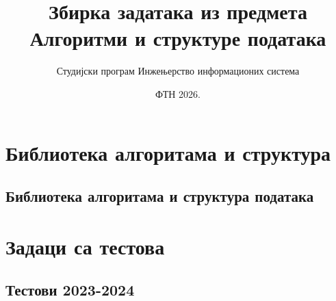 \documentclass[10pt]{book}
\title{\textbf{Збирка задатака из предмета}\\Алгоритми и структуре података}
\author{Студијски програм Инжењерство информационих система}
\date{ФТН 2026.}
\begin{document}
\maketitle

\tableofcontents

\lstlistoflistings

\newpage

\part{Библиотека алгоритама и структура}
\label{part.BibliotekaKomponenti}

\chapter{Библиотека алгоритама и структура података}




\part{Задаци са тестова}
\label{part.ZadaciTestova}

\chapter{Тестови 2023-2024}
\label{ch.Testovi2023-2024}






























\end{document}
